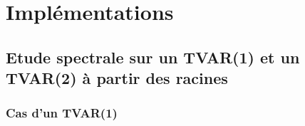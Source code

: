 \documentclass{report}
\begin{document}
\chapter{Implémentations}
\section{Etude spectrale sur un TVAR(1) et un TVAR(2) à partir des racines}
\subsection{Cas d'un TVAR(1)}



\end{document}
